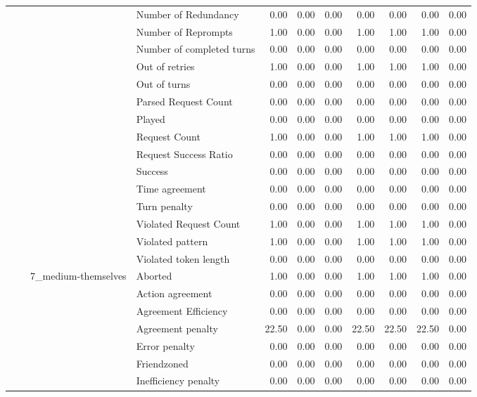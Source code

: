 \begin{tabular}{llllrrrrrrr}
 &  &  & Number of Redundancy & 0.00 & 0.00 & 0.00 & 0.00 & 0.00 & 0.00 & 0.00 \\
 &  &  & Number of Reprompts & 1.00 & 0.00 & 0.00 & 1.00 & 1.00 & 1.00 & 0.00 \\
 &  &  & Number of completed turns & 0.00 & 0.00 & 0.00 & 0.00 & 0.00 & 0.00 & 0.00 \\
 &  &  & Out of retries & 1.00 & 0.00 & 0.00 & 1.00 & 1.00 & 1.00 & 0.00 \\
 &  &  & Out of turns & 0.00 & 0.00 & 0.00 & 0.00 & 0.00 & 0.00 & 0.00 \\
 &  &  & Parsed Request Count & 0.00 & 0.00 & 0.00 & 0.00 & 0.00 & 0.00 & 0.00 \\
 &  &  & Played & 0.00 & 0.00 & 0.00 & 0.00 & 0.00 & 0.00 & 0.00 \\
 &  &  & Request Count & 1.00 & 0.00 & 0.00 & 1.00 & 1.00 & 1.00 & 0.00 \\
 &  &  & Request Success Ratio & 0.00 & 0.00 & 0.00 & 0.00 & 0.00 & 0.00 & 0.00 \\
 &  &  & Success & 0.00 & 0.00 & 0.00 & 0.00 & 0.00 & 0.00 & 0.00 \\
 &  &  & Time agreement & 0.00 & 0.00 & 0.00 & 0.00 & 0.00 & 0.00 & 0.00 \\
 &  &  & Turn penalty & 0.00 & 0.00 & 0.00 & 0.00 & 0.00 & 0.00 & 0.00 \\
 &  &  & Violated Request Count & 1.00 & 0.00 & 0.00 & 1.00 & 1.00 & 1.00 & 0.00 \\
 &  &  & Violated pattern & 1.00 & 0.00 & 0.00 & 1.00 & 1.00 & 1.00 & 0.00 \\
 &  &  & Violated token length & 0.00 & 0.00 & 0.00 & 0.00 & 0.00 & 0.00 & 0.00 \\
\cline{3-11}
 &  & \multirow[t]{27}{*}{7_medium-themselves} & Aborted & 1.00 & 0.00 & 0.00 & 1.00 & 1.00 & 1.00 & 0.00 \\
 &  &  & Action agreement & 0.00 & 0.00 & 0.00 & 0.00 & 0.00 & 0.00 & 0.00 \\
 &  &  & Agreement Efficiency & 0.00 & 0.00 & 0.00 & 0.00 & 0.00 & 0.00 & 0.00 \\
 &  &  & Agreement penalty & 22.50 & 0.00 & 0.00 & 22.50 & 22.50 & 22.50 & 0.00 \\
 &  &  & Error penalty & 0.00 & 0.00 & 0.00 & 0.00 & 0.00 & 0.00 & 0.00 \\
 &  &  & Friendzoned & 0.00 & 0.00 & 0.00 & 0.00 & 0.00 & 0.00 & 0.00 \\
 &  &  & Inefficiency penalty & 0.00 & 0.00 & 0.00 & 0.00 & 0.00 & 0.00 & 0.00 \\

\end{tabular}
